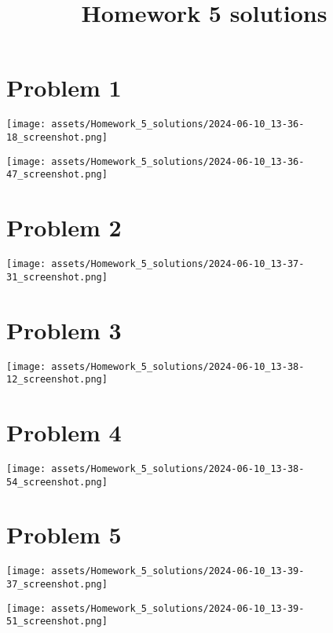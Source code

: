 \documentclass{amsart}
\date{}
\title{Homework 5 solutions}
\begin{document}
\maketitle
\section{Problem 1}
\label{sec:org9cc0189}
\begin{center}
\texttt{[image: assets/Homework\_5\_solutions/2024-06-10\_13-36-18\_screenshot.png]}
\end{center}
\begin{center}
\texttt{[image: assets/Homework\_5\_solutions/2024-06-10\_13-36-47\_screenshot.png]}
\end{center}
\section{Problem 2}
\label{sec:org2e43822}
\begin{center}
\texttt{[image: assets/Homework\_5\_solutions/2024-06-10\_13-37-31\_screenshot.png]}
\end{center}
\section{Problem 3}
\label{sec:orgee12f55}
\begin{center}
\texttt{[image: assets/Homework\_5\_solutions/2024-06-10\_13-38-12\_screenshot.png]}
\end{center}
\section{Problem 4}
\label{sec:org15d5ea6}
\begin{center}
\texttt{[image: assets/Homework\_5\_solutions/2024-06-10\_13-38-54\_screenshot.png]}
\end{center}
\section{Problem 5}
\label{sec:org2134b7b}
\begin{center}
\texttt{[image: assets/Homework\_5\_solutions/2024-06-10\_13-39-37\_screenshot.png]}
\end{center}

\begin{center}
\texttt{[image: assets/Homework\_5\_solutions/2024-06-10\_13-39-51\_screenshot.png]}
\end{center}
\end{document}
